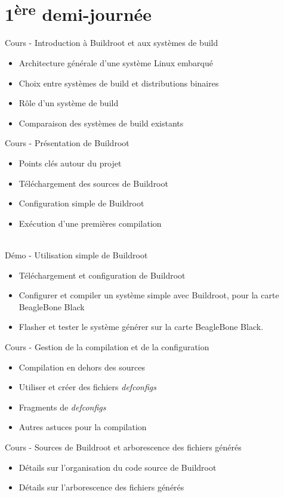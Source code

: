 \documentclass[a4paper,12pt,obeyspaces,spaces,hyphens]{article}
\begin{document}
\section{1\textsuperscript{ère} demi-journée}

\feagendatwocolumn
{Cours - Introduction à Buildroot et aux systèmes de build}
{
  \begin{itemize}
  \item Architecture générale d'une système Linux embarqué
  \item Choix entre systèmes de build et distributions binaires
  \item Rôle d'un système de build
  \item Comparaison des systèmes de build existants
  \end{itemize}
}
{Cours - Présentation de Buildroot}
{
  \begin{itemize}
  \item Points clés autour du projet
  \item Téléchargement des sources de Buildroot
  \item Configuration simple de Buildroot
  \item Exécution d'une premières compilation
  \end{itemize}
}
\\
\feagendatwocolumn
{Démo - Utilisation simple de Buildroot}
{
  \begin{itemize}
  \item Téléchargement et configuration de Buildroot
  \item Configurer et compiler un système simple avec Buildroot, pour la
        carte BeagleBone Black
  \item Flasher et tester le système générer sur la carte BeagleBone
        Black.
  \end{itemize}
}
{Cours - Gestion de la compilation et de la configuration}
{
  \begin{itemize}
  \item Compilation en dehors des sources
  \item Utiliser et créer des fichiers {\em defconfigs}
  \item Fragments de {\em defconfigs}
  \item Autres astuces pour la compilation
  \end{itemize}
}

\feagendaonecolumn
{Cours - Sources de Buildroot et arborescence des fichiers générés}
{
  \begin{itemize}
  \item Détails sur l'organisation du code source de Buildroot
  \item Détails sur l'arborescence des fichiers générés
  \end{itemize}
}
\end{document}
